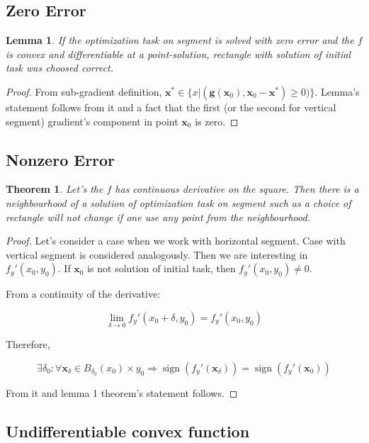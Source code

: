 \documentclass[12pt]{article}
\DeclareMathOperator{\sign}{sign}
\newtheorem{theorem}{Theorem}[section]
\newtheorem{lemma}{Lemma}
\begin{document}
\subsection{Zero Error}

\begin{lemma}\label{l1}
If the optimization task on segment is solved with zero error and the $f$ is convex and differentiable at a point-solution, rectangle with solution of initial task was choosed correct.
\end{lemma}
\begin{proof}
From sub-gradient definition, $\textbf{x}^* \in \{x|(\textbf{g}(\textbf{x}_0), \textbf{x}_0 - \textbf{x}^*) \geq 0)\}$. Lemma's statement follows from it and a fact that the first (or the second for vertical segment) gradient's component in point $\textbf{x}_0$ is zero.
\end{proof}


\subsection{Nonzero Error}
\begin{theorem}
Let's the $f$ has continuous derivative on the square. Then there is a neighbourhood of a solution of optimization task on segment such as a choice of rectangle will not change if one use any point from the   neighbourhood.
\end{theorem}
\begin{proof}
Let's consider a case when we work with horizontal segment. Case with vertical segment is considered analogously. Then we are interesting in $f_y'(x_0, y_0)$. If $\textbf{x}_0$ is not solution of initial task, then $f_y'(x_0, y_0) \neq 0$. 

From a continuity of the derivative:

$$\lim\limits_{\delta \rightarrow 0}f_y'(x_0+\delta, y_0) = f_y'(x_0, y_0)$$

Therefore, 

$$\exists \delta_0:\forall \textbf{x}_\delta\in B_{\delta_0}(x_0)\times y_0\Rightarrow \sign(f_y'(\textbf{x}_\delta)) = \sign(f_y'(\textbf{x}_0))$$

From it and lemma 1 theorem's statement follows.

\end{proof}

\subsection{Undifferentiable convex function}
\end{document}
